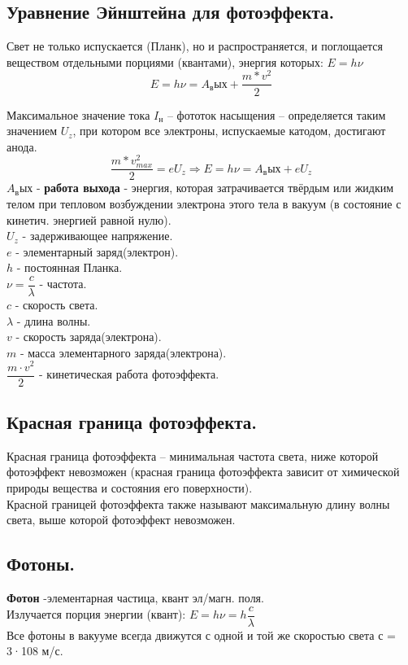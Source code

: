 \documentclass[12pt]{report}
\begin{document}
\subsection{ Уравнение Эйнштейна для фотоэффекта.}
Свет не только испускается (Планк), но и распространяется, и поглощается веществом отдельными порциями (квантами), энергия которых: $ E = h\nu $\\
\[E=h\nu=A_вых+\frac{m*v^2}{2}\]

Максимальное значение тока $I_н$ – фототок насыщения – определяется
таким значением $U_z$, при котором все электроны, испускаемые катодом, достигают анода.\\
\[\frac{m*v_{max}^2}{2}=eU_z \Rightarrow{} E=h\nu=A_вых+eU_z\]
$A_вых$ - \textbf{работа выхода} - энергия, которая затрачивается
твёрдым или жидким телом при тепловом
возбуждении электрона этого тела в вакуум (в
состояние с кинетич. энергией равной нулю).\\

$U_z$ - задерживающее напряжение.\\

$e$ - элементарный заряд(электрон).\\

$h$ - постоянная Планка.\\

$\nu = \dfrac{c}{\lambda}$ - частота.\\

$c$ - скорость света.\\

$\lambda$ - длина волны.\\

$v$ - скорость заряда(электрона).\\

$m$ - масса элементарного заряда(электрона).\\

$\dfrac{m \cdot v^2}{2}$ - кинетическая работа фотоэффекта.
\subsection{Красная граница фотоэффекта.}
Красная граница фотоэффекта – минимальная частота света, ниже которой фотоэффект невозможен (красная граница фотоэффекта зависит от химической природы вещества и состояния его поверхности).\\
Красной границей фотоэффекта также называют максимальную длину волны света, выше которой фотоэффект невозможен.
\subsection{Фотоны.}
\textbf{Фотон} -элементарная частица, квант эл/магн. поля.\\
Излучается порция энергии (квант): $E=h\nu=h\dfrac{c}{\lambda}$\\
Все фотоны в вакууме всегда движутся с одной и той же
скоростью света $с$ = 3·108 м/с.
\end{document}
